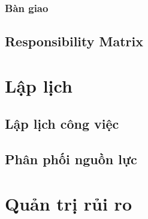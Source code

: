 \documentclass[a4paper]{book}
\begin{document}
\subsection{Bàn giao}
\section{Responsibility Matrix}
\chapter{Lập lịch}
\section{Lập lịch công việc}
\section{Phân phối nguồn lực}
\chapter{Quản trị rủi ro}
\newpage
\listoftables
\listoffigures
\newpage
 

\end{document}
